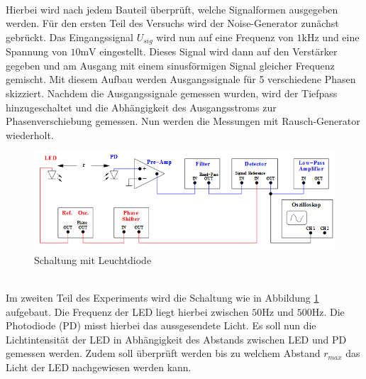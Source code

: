 \\
Hierbei wird nach jedem Bauteil überprüft, welche Signalformen ausgegeben werden.
Für den ersten Teil des Versuchs wird der Noise-Generator zunächst gebrückt.
Das Eingangssignal $U_{sig}$ wird nun auf eine Frequenz von $1\si{\kilo\hertz}$
und eine Spannung von $10\si{\milli\volt}$ eingestellt. Dieses Signal wird dann
auf den Verstärker gegeben und am Ausgang mit einem sinusförmigen Signal gleicher
Frequenz gemischt. Mit diesem Aufbau werden Ausgangssignale für 5 verschiedene
Phasen skizziert.
Nachdem die Ausgangssignale gemessen wurden, wird der Tiefpass hinzugeschaltet
und die Abhängigkeit des Ausgangsstroms zur Phasenverschiebung gemessen.
Nun werden die Messungen mit Rausch-Generator wiederholt.
\\
\begin{figure}
  \centering
  \includegraphics[width=\textwidth]{Bilder/LEDSchaltung.jpeg}
  \caption{Schaltung mit Leuchtdiode}
  \label{fig:led}
\end{figure}
\\
Im zweiten Teil des Experiments wird die Schaltung wie in Abbildung \ref{fig:led}
aufgebaut. Die Frequenz der LED liegt hierbei zwischen $50 \si{\hertz}$ und
$500 \si{\hertz}$. Die Photodiode (PD) misst hierbei das aussgesendete Licht.
Es soll nun die Lichtintensität der LED in Abhängigkeit des Abstands
zwischen LED und PD gemessen werden. Zudem soll überprüft werden bis zu welchem
Abstand $r_{max}$ das Licht der LED nachgewiesen werden kann.
\newpage
